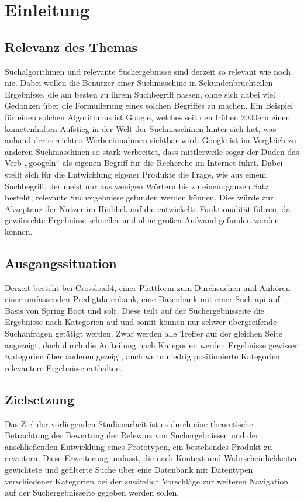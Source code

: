 \chapter{Einleitung}\label{ch:intro}

\section{Relevanz des Themas}
Suchalgorithmen und relevante Suchergebnisse sind derzeit so relevant wie noch nie. Dabei wollen die Benutzer einer Suchmaschine in Sekundenbruchteilen Ergebnisse, die am besten zu ihrem Suchbegriff passen, ohne sich dabei viel Gedanken über die Formulierung eines solchen Begriffes zu machen. Ein Beispiel für einen solchen Algorithmus ist Google, welches seit den frühen 2000ern einen kometenhaften Aufstieg in der Welt der Suchmaschinen hinter sich hat, was anhand der erreichten Werbeeinnahmen sichtbar wird.\cite{googleUmsatz} Google ist im Vergleich zu anderen Suchmaschinen so stark verbreitet,\cite{googleShare} dass mittlerweile sogar der Duden das Verb „googeln“ als eigenen Begriff für die Recherche im Internet führt.\cite{dudenGooglen}
Dabei stellt sich für die Entwicklung eigener Produkte die Frage, wie aus einem Suchbegriff, der meist nur aus wenigen Wörtern bis zu einem ganzen Satz besteht, relevante Suchergebnisse gefunden werden können. Dies würde zur Akzeptanz der Nutzer im Hinblick auf die entwickelte Funktionalität führen, da gewünschte Ergebnisse schneller und ohne großen Aufwand gefunden werden können.

\section{Ausgangssituation}
Derzeit besteht bei Crossload4, einer Plattform zum Durchsuchen und Anhören einer umfassenden Predigtdatenbank, eine Datenbank mit einer Such \gls{api} auf Basis von Spring Boot und \gls{solr}. Diese teilt auf der Suchergebnisseite die Ergebnisse nach Kategorien auf und somit können nur schwer übergreifende Suchanfragen getätigt werden. Zwar werden alle Treffer auf der gleichen Seite angezeigt, doch durch die Aufteilung nach Kategorien werden Ergebnisse gewisser Kategorien über anderen gezeigt, auch wenn niedrig positionierte Kategorien relevantere Ergebnisse enthalten.

\section{Zielsetzung}
Das Ziel der vorliegenden Studienarbeit ist es durch eine theoretische Betrachtung der Bewertung der Relevanz von Suchergebnissen und der anschließenden Entwicklung eines Prototypen, ein bestehendes Produkt zu erweitern. Diese Erweiterung umfasst, die nach Kontext und Wahrscheinlichkeiten gewichtete und gefilterte Suche über eine Datenbank mit Datentypen verschiedener Kategorien bei der zusätzlich Vorschläge zur weiteren Navigation auf der Suchergebnisseite gegeben werden sollen.
